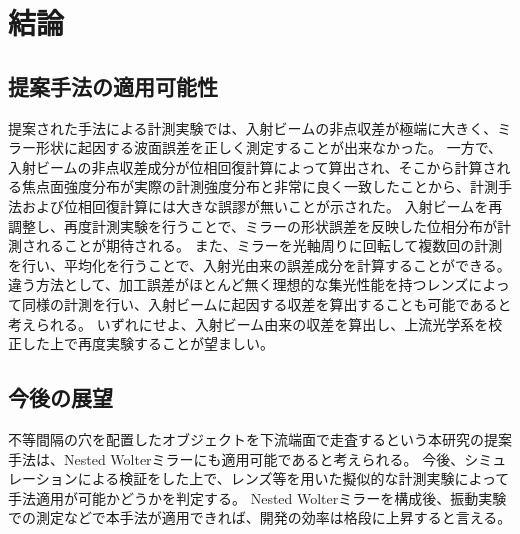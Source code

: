 \chapter{結論}
\thispagestyle{empty}
\label{chap6}
\graphicspath{{chap6/figure/}}
\minitoc

\newpage


\section{提案手法の適用可能性}
\label{chap6_conclusion}

提案された手法による計測実験では、入射ビームの非点収差が極端に大きく、ミラー形状に起因する波面誤差を正しく測定することが出来なかった。
一方で、入射ビームの非点収差成分が位相回復計算によって算出され、そこから計算される焦点面強度分布が実際の計測強度分布と非常に良く一致したことから、計測手法および位相回復計算には大きな誤謬が無いことが示された。
入射ビームを再調整し、再度計測実験を行うことで、ミラーの形状誤差を反映した位相分布が計測されることが期待される。
また、ミラーを光軸周りに回転して複数回の計測を行い、平均化を行うことで、入射光由来の誤差成分を計算することができる。
違う方法として、加工誤差がほとんど無く理想的な集光性能を持つレンズによって同様の計測を行い、入射ビームに起因する収差を算出することも可能であると考えられる。
いずれにせよ、入射ビーム由来の収差を算出し、上流光学系を校正した上で再度実験することが望ましい。

\section{今後の展望}
\label{chap6_futureworks}

不等間隔の穴を配置したオブジェクトを下流端面で走査するという本研究の提案手法は、Nested Wolterミラーにも適用可能であると考えられる。
今後、シミュレーションによる検証をした上で、レンズ等を用いた擬似的な計測実験によって手法適用が可能かどうかを判定する。
Nested Wolterミラーを構成後、振動実験での測定などで本手法が適用できれば、開発の効率は格段に上昇すると言える。


\clearpage
\newpage


